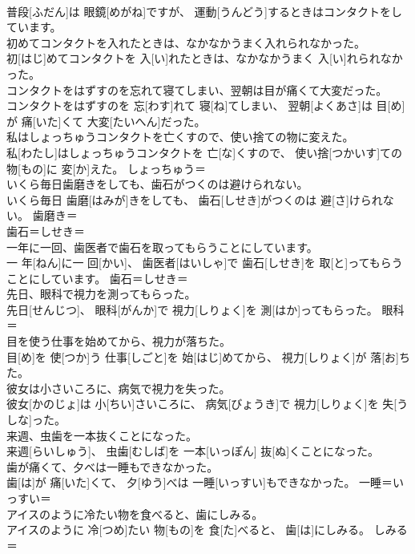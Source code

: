 \documentclass[8pt]{extreport}
\begin{document}
\begin{CJK}{UTF8}{min}
\\	普段[ふだん]は 眼鏡[めがね]ですが、 運動[うんどう]するときはコンタクトをしています。	
\\	初めてコンタクトを入れたときは、なかなかうまく入れられなかった。	
\\	初[はじ]めてコンタクトを 入[い]れたときは、なかなかうまく 入[い]れられなかった。	
\\	コンタクトをはずすのを忘れて寝てしまい、翌朝は目が痛くて大変だった。	
\\	コンタクトをはずすのを 忘[わす]れて 寝[ね]てしまい、 翌朝[よくあさ]は 目[め]が 痛[いた]くて 大変[たいへん]だった。	
\\	私はしょっちゅうコンタクトを亡くすので、使い捨ての物に変えた。	
\\	私[わたし]はしょっちゅうコンタクトを 亡[な]くすので、 使い捨[つかいす]ての 物[もの]に 変[か]えた。	しょっちゅう＝ 
\\	いくら毎日歯磨きをしても、歯石がつくのは避けられない。	
\\	いくら毎日 歯磨[はみが]きをしても、 歯石[しせき]がつくのは 避[さ]けられない。	歯磨き＝ 
\\	歯石＝しせき＝ 
\\	一年に一回、歯医者で歯石を取ってもらうことにしています。	
\\	一 年[ねん]に一 回[かい]、 歯医者[はいしゃ]で 歯石[しせき]を 取[と]ってもらうことにしています。	歯石＝しせき＝ 
\\	先日、眼科で視力を測ってもらった。	
\\	先日[せんじつ]、 眼科[がんか]で 視力[しりょく]を 測[はか]ってもらった。	眼科＝ 
\\	目を使う仕事を始めてから、視力が落ちた。	
\\	目[め]を 使[つか]う 仕事[しごと]を 始[はじ]めてから、 視力[しりょく]が 落[お]ちた。	
\\	彼女は小さいころに、病気で視力を失った。	
\\	彼女[かのじょ]は 小[ちい]さいころに、 病気[びょうき]で 視力[しりょく]を 失[うしな]った。	
\\	来週、虫歯を一本抜くことになった。	
\\	来週[らいしゅう]、 虫歯[むしば]を 一本[いっぽん] 抜[ぬ]くことになった。	
\\	歯が痛くて、夕べは一睡もできなかった。	
\\	歯[は]が 痛[いた]くて、 夕[ゆう]べは 一睡[いっすい]もできなかった。	一睡＝いっすい＝ 
\\	アイスのように冷たい物を食べると、歯にしみる。	
\\	アイスのように 冷[つめ]たい 物[もの]を 食[た]べると、 歯[は]にしみる。	しみる＝ 

\end{CJK}
\end{document}
